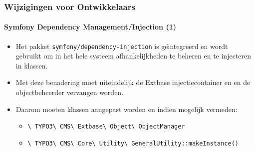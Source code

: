\begin{frame}[fragile]
	\frametitle{Wijzigingen voor Ontwikkelaars}
	\framesubtitle{Symfony Dependency Management/Injection (1)}

	\begin{itemize}
		\item Het pakket \texttt{symfony/dependency-injection} is ge\"{\i}ntegreerd
			en wordt gebruikt om in het hele systeem afhankelijkheden te beheren en
			te injecteren in klassen.

		\item Met deze benadering moet uiteindelijk de Extbase injectiecontainer en
			en de objectbeheerder vervangen worden.

		\item Daarom moeten klassen aangepast worden en indien mogelijk vermeden:

			\begin{itemize}\small
				\item \texttt{\textbackslash
					TYPO3\textbackslash
					CMS\textbackslash
					Extbase\textbackslash
					Object\textbackslash
					ObjectManager}
				\item \texttt{\textbackslash
					TYPO3\textbackslash
					CMS\textbackslash
					Core\textbackslash
					Utility\textbackslash
					GeneralUtility::makeInstance()}
			\end{itemize}\normalsize

	\end{itemize}

\end{frame}


